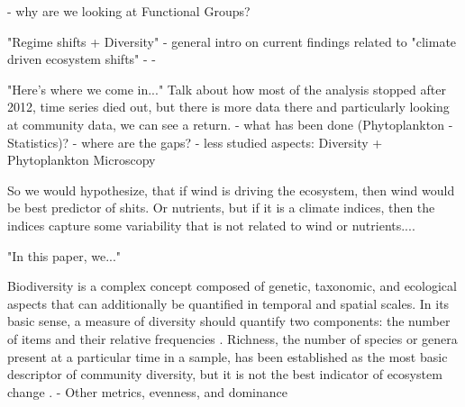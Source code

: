     - why are we looking at Functional Groups?
    
    "Regime shifts + Diversity" - general intro on current findings related to "climate driven ecosystem shifts"
        - %
        - 

        "Here's where we come in..." Talk about how most of the analysis stopped after 2012, time series died out, but there is more data there and particularly looking at community data, we can see a return.
    - what has been done (Phytoplankton - Statistics)?
    - where are the gaps?
    - less studied aspects: Diversity + Phytoplankton Microscopy

    So we would hypothesize, that if wind is driving the ecosystem, then wind would be best predictor of shits.
    Or nutrients, but if it is a climate indices, then the indices capture some variability that is not related to wind or nutrients....
        
    
    "In this paper, we..." 





    Biodiversity is a complex concept composed of genetic, taxonomic, and ecological aspects that can additionally be quantified in temporal and spatial scales. In its basic sense, a measure of diversity should quantify two components: the number of items and their relative frequencies \cite{borics_freshwater_2021}. 
    Richness, the number of species or genera present at a particular time in a sample, has been established as the most basic descriptor of community diversity, but it is not the best indicator of ecosystem change \cite{hillebrand_biodiversity_2018}.
    - Other metrics, evenness, and dominance




